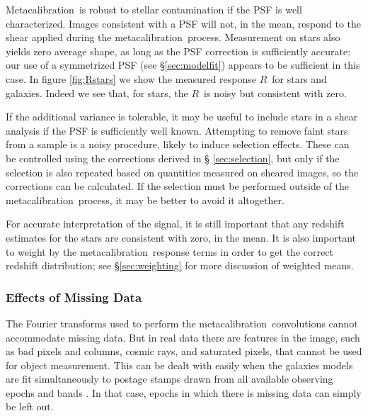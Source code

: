\documentclass[a4paper,fleqn,usenatbib]{mnras}
\newcommand{\mcal}{metacalibration}
\newcommand{\Mcal}{Metacalibration}
\newcommand{\mcalR}{$R$}
\newcommand{\nsimNStar}{$5.6 \times 10^8$}
\newcommand{\nsimNstarperc}{10\%}
\newcommand{\bdsim}{\texttt{BDK}}
\newcommand{\bdstar}{\texttt{BDK+Stars}}
\begin{document}

\Mcal\ is robust to stellar contamination if the PSF is well
characterized.  Images consistent with a PSF will not, in the mean, respond to the shear
applied during the \mcal\ process.  Measurement on stars also yields zero average shape, as
long as the PSF correction is sufficiently accurate: our use of a symmetrized
PSF (see \S \ref{sec:modelfit}) appears to be sufficient in this case.
In figure \ref{fig:Rstars} we show the measured response \mcalR\ for stars and
galaxies.  Indeed we see that, for stars, the \mcalR\ is noisy but consistent
with zero.

If the additional variance is tolerable, it may be useful to include stars in a
shear analysis if the PSF is sufficiently well known.  Attempting to remove
faint stars from a sample is a noisy procedure, likely to induce selection
effects.  These can be controlled using the corrections derived in \S
\ref{sec:selection}, but only if the selection is also repeated based on
quantities measured on sheared images, so the corrections can be calculated.
If the selection must be performed outside of the \mcal\ process, it may be
better to avoid it altogether.

For accurate interpretation of the signal, it is still important that any
redshift estimates for the stars are consistent with zero, in the mean. It is
also important to weight by the \mcal\ response terms in order to get the
correct redshift distribution; see \S \ref{sec:weighting} for more
discussion of weighted means.

\subsubsection{Effects of Missing Data}

The Fourier transforms used to perform the \mcal\ convolutions cannot
accommodate missing data.  But in real data there are features in the image,
such as bad pixels and columns, cosmic rays, and saturated pixels, that cannot
be used for object measurement.  This can be dealt with easily when the
galaxies models are fit simultaneously to postage stamps drawn from all
available observing epochs and bands \citep[e.g.][]{Jarvis2016}.  In that case,
epochs in which there is missing data can simply be left out.
\end{document}

